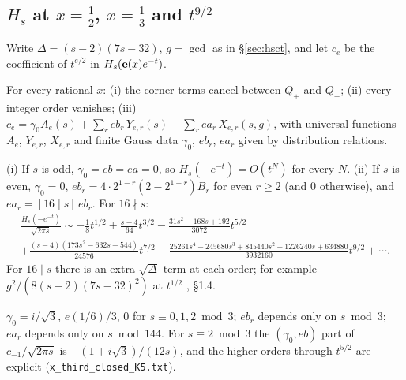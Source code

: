 \subsection{$H_s$ at $x=\tfrac12$, $x=\tfrac13$ and $t^{9/2}$}\label{sec:rev5Hs}
Write $\Delta=(s-2)(7s-32)$, $g=\gcd$ as in \S\ref{sec:hsct}, and let $c_e$ be the coefficient of $t^{e/2}$ in $H_s(\mathbf{e}(x)e^{-t})$.
\begin{proposition}\label{prop:R123}
For every rational $x$: (i) the corner terms cancel between $Q_+$ and $Q_-$; (ii) every integer order vanishes; (iii) $c_e=\gamma_0A_e(s)+\sum_r eb_r\,Y_{e,r}(s)+\sum_r ea_r\,X_{e,r}(s,g)$,
with universal functions $A_e$, $Y_{e,r}$, $X_{e,r}$ and finite Gauss data $\gamma_0$, $eb_r$, $ea_r$ given by distribution relations.
\end{proposition}
\begin{proposition}[$x=\tfrac12$ \src{29}, \S1.4, Proposition O]\label{prop:xhalf}
(i) If $s$ is odd, $\gamma_0=eb=ea=0$, so $H_s(-e^{-t})=O(t^N)$ for every $N$. (ii) If $s$ is even, $\gamma_0=0$, $eb_r=4\cdot2^{1-r}(2-2^{1-r})B_r$ for even $r\ge2$ (and $0$ otherwise), and
$ea_r=[16\mid s]\,eb_r$. For $16\nmid s$:
\begin{multline*}\frac{H_s(-e^{-t})}{\sqrt{2\pi s}}\sim-\tfrac18t^{1/2}+\tfrac{s-4}{64}t^{3/2}-\tfrac{31s^2-168s+192}{3072}t^{5/2}\\+\tfrac{(s-4)(173s^2-632s+544)}{24576}t^{7/2}
-\tfrac{25261s^4-245680s^3+845440s^2-1226240s+634880}{3932160}t^{9/2}+\cdots.\end{multline*}
For $16\mid s$ there is an extra $\sqrt\Delta$ term at each order; for example $g^2/(8(s-2)(7s-32)^2)$ at $t^{1/2}$ , \S1.4.
\end{proposition}
\begin{proposition}[$x=\tfrac13$ \src{29}, \S1.5]\label{prop:xthird}
$\gamma_0=i/\sqrt3$, $e(1/6)/3$, $0$ for $s\equiv0,1,2\bmod3$; $eb_r$ depends only on $s\bmod3$; $ea_r$ depends only on $s\bmod144$. For $s\equiv2\bmod3$ the $(\gamma_0,eb)$ part of
$c_{-1}/\sqrt{2\pi s}$ is $-(1+i\sqrt3)/(12s)$, and the higher orders through $t^{5/2}$ are explicit (\texttt{x\_third\_closed\_K5.txt}).
\end{proposition}

